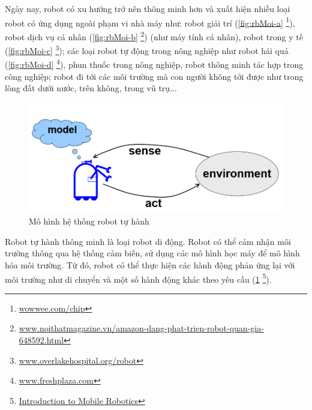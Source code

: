 Ngày nay, robot có xu hướng trở nên thông minh hơn và xuất hiện nhiều loại robot có ứng dụng ngoài phạm vi nhà máy như:
robot giải trí (\figurename{\ref{fig:rbMoi-a}} \footnote{\url{wowwee.com/chip}}),
robot dịch vụ cá nhân (\figurename{\ref{fig:rbMoi-b}} \footnote{\url{www.noithatmagazine.vn/amazon-dang-phat-trien-robot-quan-gia-648592.html}}) (như máy tính cá nhân), robot trong y tế (\figurename{\ref{fig:rbMoi-c}} \footnote{\url{www.overlakehospital.org/robot}}); các loại robot tự động trong nông nghiệp như robot hái quả (\figurename{\ref{fig:rbMoi-d}} \footnote{\href{www.freshplaza.com/article/175737/Mechanical-harvesting-robot-received-attention-at-Macfrut/}{www.freshplaza.com}}), phun thuốc trong nông nghiệp, robot thông minh tác hợp trong công nghiệp; robot đi tới các môi trường mà con người không tới được như trong lòng đất dưới nước, trên không, trong vũ trụ...

\begin{figure}[htp]
  \centering
  \includegraphics[width=12cm]{figures/c1_AutonomousRBModel.png}
  \caption{Mô hình hệ thống robot tự hành}
  \label{fig:MohinhRB}
\end{figure}


Robot tự hành thông minh là loại robot di động. Robot có thể cảm nhận môi trường thông qua hệ thống cảm biến, sử dụng các mô hình học máy để mô hình hóa môi trường. Từ đó, robot có thể thực hiện các hành động phản ứng lại với môi trường như di chuyển và một số hành động khác theo yêu cầu (\figurename{\ref{fig:MohinhRB}} \footnote{\href{http://ais.informatik.uni-freiburg.de/teaching/ss18/robotics/slides/00-intro.pdf}{Introduction to Mobile Robotics}}).

